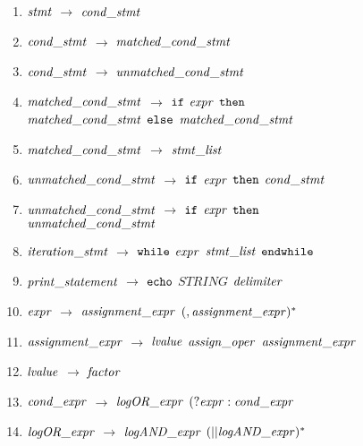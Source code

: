 \begin{enumerate}
\item \noindent ${\it stmt}$ $\rightarrow$ ${\it cond\_stmt}$ \\
\item ${\it cond\_stmt}$ $\rightarrow$ ${\it matched\_cond\_stmt}$ \\
\item ${\it cond\_stmt}$ $\rightarrow$ ${\it unmatched\_cond\_stmt}$\\
\item ${\it matched\_cond\_stmt}$ $\rightarrow$ ${\tt if}$ ${\it expr}$ ${\tt then}$ \\ ${\it matched\_cond\_stmt}$ ${\tt else}$ ${\it matched\_cond\_stmt}$ \\
\item ${\it matched\_cond\_stmt}$ $\rightarrow$ ${\it stmt\_list}$ \\


\item \noindent ${\it unmatched\_cond\_stmt}$ $\rightarrow$ ${\tt if}$ ${\it expr}$ ${\tt then}$ ${\it cond\_stmt}$ \\
\item ${\it unmatched\_cond\_stmt}$ $\rightarrow$ ${\tt if}$ ${\it expr}$ ${\tt then}$ \\ ${\it unmatched\_cond\_stmt}$ \\
 
\item \noindent ${\it iteration\_stmt}$ $\rightarrow$ ${\tt while}$ ${\it expr}$ ${\it stmt\_list}$ ${\tt endwhile}$ 

\item \noindent ${\it print\_statement}$ $\rightarrow$ ${\tt echo}$ $STRING$ ${\it delimiter}$
\item \noindent ${\it expr}$ $\rightarrow$ ${\it assignment\_expr}$ $(, {\it assignment\_expr})^{*}$\\  
\item ${\it assignment\_expr}$ $\rightarrow$ ${\it lvalue}$ ${\it assign\_oper}$ ${\it assignment\_expr}$\\
\item ${\it lvalue}$ $\rightarrow$ ${\it factor}$\\

\item ${\it cond\_expr}$ $\rightarrow$ ${\it logOR\_expr}$ $(?{\it expr}:{\it cond\_expr}$ \\
\item ${\it logOR\_expr}$ $\rightarrow$ ${\it logAND\_expr}$ $({\tt | |} {\it logAND\_expr})^{*}$ \\


\end{enumerate}
